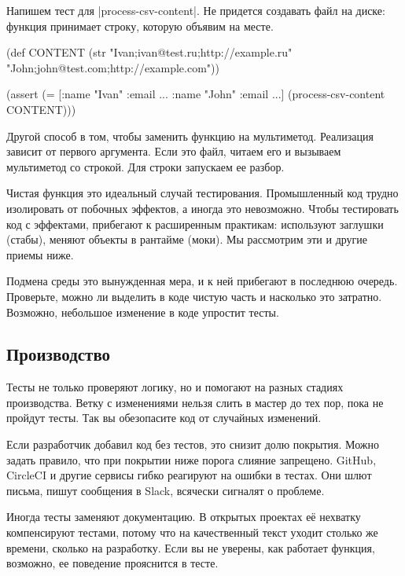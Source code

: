 Напишем тест для \spverb|process-csv-content|. Не придется создавать файл на
диске: функция принимает строку, которую объявим на месте.

\begin{english}
  \begin{clojure}
(def CONTENT
  (str "Ivan;ivan@test.ru;http://example.ru"
       \newline
       "John;john@test.com;http://example.com"))

(assert (= [{:name "Ivan" :email ...}
            {:name "John" :email ...}]
           (process-csv-content CONTENT)))
  \end{clojure}
\end{english}

Другой способ в том, чтобы заменить функцию на мультиметод. Реализация
зависит от первого аргумента. Если это файл, читаем его и вызываем мультиметод
со строкой. Для строки запускаем ее разбор.

Чистая функция это идеальный случай тестирования. Промышленный код трудно
изолировать от побочных эффектов, а иногда это невозможно. Чтобы тестировать код
с эффектами, прибегают к расширенным практикам: используют заглушки (стабы),
меняют объекты в рантайме (моки). Мы рассмотрим эти и другие приемы ниже.

Подмена среды это вынужденная мера, и к ней прибегают в последнюю
очередь. Проверьте, можно ли выделить в коде чистую часть и насколько это
затратно. Возможно, небольшое изменение в коде упростит тесты.

\subsection{Производство}

Тесты не только проверяют логику, но и помогают на разных стадиях
производства. Ветку с изменениями нельзя слить в мастер до тех пор, пока не
пройдут тесты. Так вы обезопасите код от случайных изменений.

Если разработчик добавил код без тестов, это снизит долю покрытия. Можно задать
правило, что при покрытии ниже порога слияние запрещено. GitHub, CircleCI и
другие сервисы гибко реагируют на ошибки в тестах. Они шлют письма, пишут
сообщения в Slack, всячески сигналят о проблеме.

Иногда тесты заменяют документацию. В открытых проектах е\"{е} нехватку
компенсируют тестами, потому что на качественный текст уходит столько же
времени, сколько на разработку. Если вы не уверены, как работает функция,
возможно, ее поведение прояснится в тесте.

